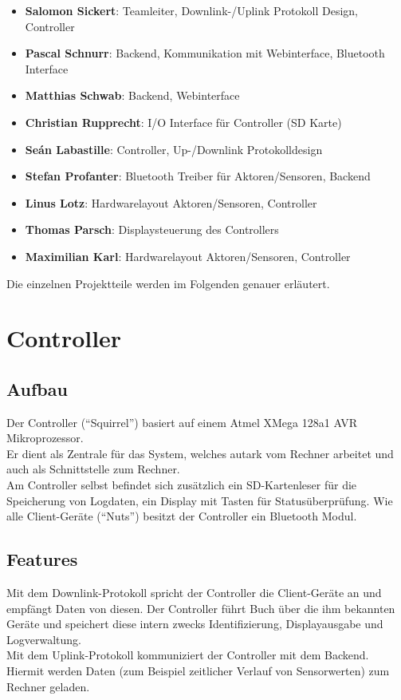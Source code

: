 \documentclass[12pt,a4paper]{article}
\begin{document}
\begin{itemize}
	\item {\bf Salomon Sickert}: Teamleiter, Downlink-/Uplink Protokoll Design, Controller
	\item {\bf Pascal Schnurr}: Backend, Kommunikation mit Webinterface, Bluetooth Interface
	\item {\bf Matthias Schwab}: Backend, Webinterface
	\item {\bf Christian Rupprecht}: I/O Interface für Controller (SD Karte)
	\item {\bf Seán Labastille}: Controller, Up-/Downlink Protokolldesign
	\item {\bf Stefan Profanter}: Bluetooth Treiber für Aktoren/Sensoren, Backend
	\item {\bf Linus Lotz}: Hardwarelayout Aktoren/Sensoren, Controller
	\item {\bf Thomas Parsch}: Displaysteuerung des Controllers
	\item {\bf Maximilian Karl}: Hardwarelayout Aktoren/Sensoren, Controller
\end{itemize}
Die einzelnen Projektteile werden im Folgenden genauer erläutert.

\section{Controller}

\subsection{Aufbau}

Der Controller (``Squirrel'') basiert auf einem Atmel XMega 128a1 AVR Mikroprozessor. \\
Er dient als Zentrale für das System, welches autark vom Rechner arbeitet und auch als Schnittstelle zum Rechner. \\
Am Controller selbst befindet sich zusätzlich ein SD-Kartenleser für die Speicherung von Logdaten, ein Display mit Tasten für Statusüberprüfung.
Wie alle Client-Geräte (``Nuts'') besitzt der Controller ein Bluetooth Modul.

\subsection{Features}

Mit dem Downlink-Protokoll spricht der Controller die Client-Geräte an und empfängt Daten von diesen. Der Controller führt Buch über die ihm bekannten Geräte und speichert diese intern zwecks Identifizierung, Displayausgabe und Logverwaltung.\\
Mit dem Uplink-Protokoll kommuniziert der Controller mit dem Backend. Hiermit werden Daten (zum Beispiel zeitlicher Verlauf von Sensorwerten) zum Rechner geladen. \\
\end{document}
